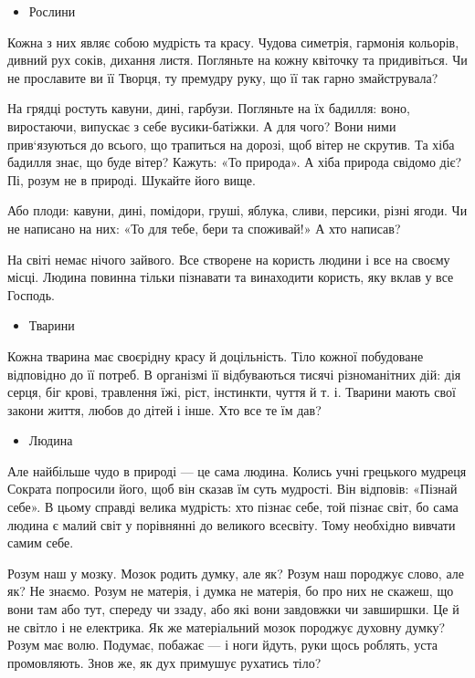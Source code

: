 \documentclass[main.tex]{subfiles}
\begin{document}
\begin{itemize}
    \item Рослини
\end{itemize}

Кожна з них являє собою мудрість та красу. Чудова симетрія, гармонія кольорів, дивний рух соків, дихання листя. Погляньте на кожну квіточку та придивіться. Чи не прославите ви її Творця, ту премудру руку, що її так гарно змайструвала?

На грядці ростуть кавуни, дині, гарбузи. Погляньте на їх бадилля: воно, виростаючи, випускає з себе вусики-батіжки. А для чого? Вони ними прив`язуються до всього, що трапиться на дорозі, щоб вітер не скрутив. Та хіба бадилля знає, що буде вітер? Кажуть: «То природа». А хіба природа свідомо діє? Пі, розум не в природі. Шукайте його вище.

Або плоди: кавуни, дині, помідори, груші, яблука, сливи, персики, різні ягоди. Чи не написано на них: «То для тебе, бери та споживай!» А хто написав?

На світі немає нічого зайвого. Все створене на користь людини і все на своєму місці. Людина повинна тільки пізнавати та винаходити користь, яку вклав у все Господь.

\begin{itemize}
    \item Тварини
\end{itemize}

Кожна тварина має своєрідну красу й доцільність. Тіло кожної побудоване відповідно до її потреб. В організмі її відбуваються тисячі різноманітних дій: дія серця, біг крові, травлення їжі, ріст, інстинкти, чуття й т. і. Тварини мають свої закони життя, любов до дітей і інше. Хто все те їм дав?

\begin{itemize}
    \item Людина
\end{itemize}

Але найбільше чудо в природі — це сама людина.
Колись учні грецького мудреця Сократа попросили його, щоб він сказав їм суть мудрості. Він відповів: «Пізнай себе». В цьому справді велика мудрість: хто пізнає себе, той пізнає світ, бо сама людина є малий світ у порівнянні до великого всесвіту. Тому необхідно вивчати самим себе.

Розум наш у мозку. Мозок родить думку, але як? Розум наш породжує слово, але як? Не знаємо. Розум не матерія, і думка не матерія, бо про них не скажеш, що вони там або тут, спереду чи ззаду, або які вони завдовжки чи завширшки. Це й не світло і не електрика. Як же матеріальний мозок породжує духовну думку? Розум має волю. Подумає, побажає — і ноги йдуть, руки щось роблять, уста промовляють. Знов же, як дух примушує рухатись тіло?
\end{document}
